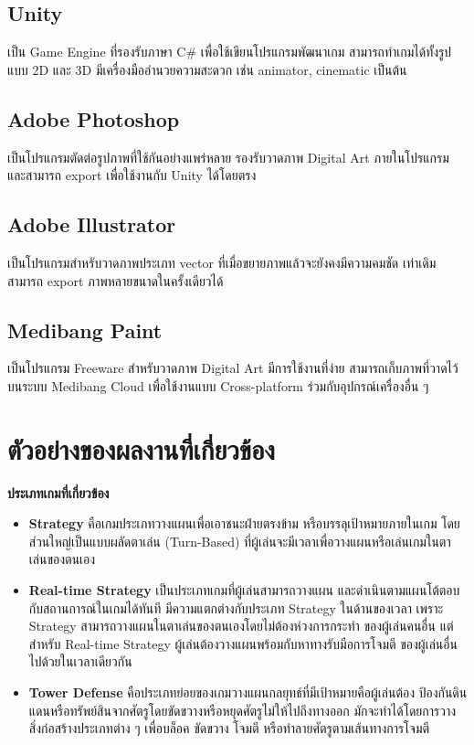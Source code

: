 \documentclass[12pt,oneside,openright,a4paper]{cpe-thai-project}
\begin{document}
\subsection{Unity}
เป็น Game Engine ที่รองรับภาษา C\# เพื่อใช้เขียนโปรแกรมพัฒนาเกม  
สามารถทำเกมได้ทั้งรูปแบบ 2D และ 3D มีเครื่องมืออำนวยความสะดวก 
เช่น animator, cinematic เป็นต้น

\subsection{Adobe Photoshop}
เป็นโปรแกรมตัดต่อรูปภาพที่ใช้กันอย่างแพร่หลาย รองรับวาดภาพ Digital Art 
ภายในโปรแกรม และสามารถ export เพื่อใช้งานกับ Unity ได้โดยตรง
 
\subsection{Adobe Illustrator}
	เป็นโปรแกรมสำหรับวาดภาพประเภท vector ที่เมื่อขยายภาพแล้วจะยังคงมีความคมชัด
  เท่าเดิม สามารถ export ภาพหลายขนาดในครั้งเดียวได้
 
\subsection{Medibang Paint} 
เป็นโปรแกรม Freeware สำหรับวาดภาพ Digital Art มีการใช้งานที่ง่าย 
สามารถเก็บภาพที่วาดไว้บนระบบ Medibang Cloud เพื่อใช้งานแบบ Cross-platform 
ร่วมกับอุปกรณ์เครื่องอื่น ๆ


\pagebreak
\section{ตัวอย่างของผลงานที่เกี่ยวข้อง}
\textbf{ประเภทเกมที่เกี่ยวข้อง}
\begin{itemize}
  \item \textbf{Strategy} คือเกมประเภทวางแผนเพื่อเอาชนะฝ่ายตรงข้าม 
  หรือบรรลุเป้าหมายภายในเกม โดยส่วนใหญ่เป็นแบบผลัดตาเล่น (Turn-Based) 
  ที่ผู้เล่นจะมีเวลาเพื่อวางแผนหรือเล่นเกมในตาเล่นของตนเอง
  \item \textbf{Real-time Strategy} เป็นประเภทเกมที่ผู้เล่นสามารถวางแผน
  และดำเนินตามแผนโต้ตอบกับสถานการณ์ในเกมได้ทันที มีความแตกต่างกับประเภท Strategy 
  ในด้านของเวลา เพราะ Strategy สามารถวางแผนในตาเล่นของตนเองโดยไม่ต้องห่วงการกระทำ
  ของผู้เล่นคนอื่น แต่สำหรับ Real-time Strategy ผู้เล่นต้องวางแผนพร้อมกับหาทางรับมือการโจมตี
  ของผู้เล่นอื่นไปด้วยในเวลาเดียวกัน
  \item \textbf{Tower Defense} คือประเภทย่อยของเกมวางแผนกลยุทธ์ที่มีเป้าหมายคือผู้เล่นต้อง
  ป้องกันดินแดนหรือทรัพย์สินจากศัตรูโดยขัดขวางหรือหยุดศัตรูไม่ให้ไปถึงทางออก 
  มักจะทำได้โดยการวางสิ่งก่อสร้างประเภทต่าง ๆ เพื่อบล็อค ขัดขวาง โจมตี 
  หรือทำลายศัตรูตามเส้นทางการโจมตี
\end{itemize}
\end{document}
